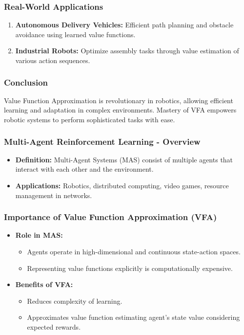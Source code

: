 \documentclass[aspectratio=169]{beamer}
\begin{document}
\begin{frame}[fragile]
    \frametitle{Real-World Applications}
    \begin{enumerate}
        \item \textbf{Autonomous Delivery Vehicles:} Efficient path planning and obstacle avoidance using learned value functions.
        \item \textbf{Industrial Robots:} Optimize assembly tasks through value estimation of various action sequences.
    \end{enumerate}
\end{frame}

\begin{frame}[fragile]
    \frametitle{Conclusion}
    \begin{block}{}
        Value Function Approximation is revolutionary in robotics, allowing efficient learning and adaptation in complex environments. Mastery of VFA empowers robotic systems to perform sophisticated tasks with ease.
    \end{block}
\end{frame}

\begin{frame}[fragile]
    \frametitle{Multi-Agent Reinforcement Learning - Overview}
    \begin{itemize}
        \item \textbf{Definition:} Multi-Agent Systems (MAS) consist of multiple agents that interact with each other and the environment.
        \item \textbf{Applications:} Robotics, distributed computing, video games, resource management in networks.
    \end{itemize}
\end{frame}

\begin{frame}[fragile]
    \frametitle{Importance of Value Function Approximation (VFA)}
    \begin{itemize}
        \item \textbf{Role in MAS:} 
        \begin{itemize}
            \item Agents operate in high-dimensional and continuous state-action spaces.
            \item Representing value functions explicitly is computationally expensive.
        \end{itemize}
        \item \textbf{Benefits of VFA:} 
        \begin{itemize}
            \item Reduces complexity of learning.
            \item Approximates value function estimating agent's state value considering expected rewards.
        \end{itemize}
    \end{itemize}
\end{frame}
\end{document}
